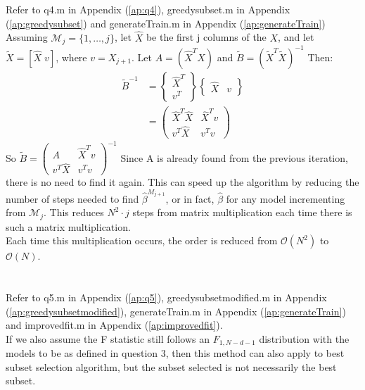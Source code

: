 \documentclass{article}
\begin{document}
	\section{}
	Refer to q4.m in Appendix (\ref{ap:q4}), greedysubset.m in Appendix (\ref{ap:greedysubset}) and generateTrain.m in Appendix (\ref{ap:generateTrain}) \\
	Assuming $ \mathcal{M}_j = \{1, \dots, j\} $, let $ \hat{X} $ be the first j columns of the $ X $, and let $ \tilde{X} = [\hat{X}\; v] $, where $ v = X_{j+1} $. Let $ A = (\hat{X}^T\hat{X}) $ and $ \tilde{B} = (\tilde{X}^T\tilde{X})^{-1} $ Then:\\
	\begin{align}
		\tilde{B}^{-1} & = \begin{Bmatrix} \hat{X}^T \\ v^T \end{Bmatrix} \begin{Bmatrix}\hat{X} & v\end{Bmatrix}\\
		& = \begin{pmatrix}\hat{X}^T\hat{X} & \hat{X}^Tv \\ v^T \hat{X} & v^Tv\end{pmatrix}
	\end{align}
	So $ \tilde{B} = \begin{pmatrix}A & \hat{X}^Tv \\ v^T \hat{X} & v^Tv\end{pmatrix}^{-1} $
	Since A is already found from the previous iteration, there is no need to find it again. This can speed up the algorithm by reducing the number of steps needed to find $ \hat{\beta}^{M_{j+1}} $, or in fact,  $ \hat{\beta} $ for any model incrementing from $ \mathcal{M}_j $. This reduces $ N^2 \cdot j $ steps from matrix multiplication each time there is such a matrix multiplication.\\
	Each time this multiplication occurs, the order is reduced from $ \mathcal{O}(N^2) $ to $ \mathcal{O}(N) $.
	
	\section{}
	Refer to q5.m in Appendix (\ref{ap:q5}), greedysubsetmodified.m in Appendix (\ref{ap:greedysubsetmodified}), generateTrain.m in Appendix (\ref{ap:generateTrain}) and improvedfit.m in Appendix (\ref{ap:improvedfit}).\\
	If we also assume the F statistic still follows an $ F_{1, N-d-1} $ distribution with the models to be as defined in question 3, then this method can also apply to best subset selection algorithm, but the subset selected is not necessarily the best subset.
	
\end{document}
